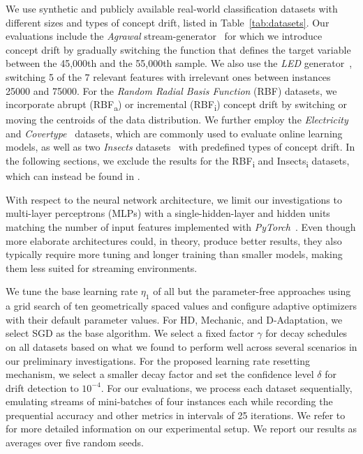 \documentclass{article} %
\begin{document}
We use synthetic and publicly available real-world classification datasets with different sizes and types of concept drift, listed in Table~\ref{tab:datasets}.
Our evaluations include the \textit{Agrawal} stream-generator~\citep{agrawalDatabaseMiningPerformance1993} for which we introduce concept drift by gradually switching the function that defines the target variable between the 45,000th and the 55,000th sample.
We also use the \textit{LED} generator~\citep{gordonClassificationRegressionTrees1984}, switching 5 of the 7 relevant features with irrelevant ones between instances 25000 and 75000.
For the \textit{Random Radial Basis Function} (RBF) datasets, we incorporate abrupt (RBF\textsubscript{a}) or incremental (RBF\textsubscript{i}) concept drift by switching or moving the centroids of the data distribution.
We further employ the \textit{Electricity} and \textit{Covertype}~\citep{misc_covertype_31} datasets, which are commonly used to evaluate online learning models, as well as two \textit{Insects} datasets~\citep{souzaChallengesBenchmarkingStream2020} with predefined types of concept drift.
In the following sections, we exclude the results for the RBF\textsubscript{i} and Insects\textsubscript{i} datasets, which can instead be found in .

With respect to the neural network architecture, we limit our investigations to multi-layer perceptrons (MLPs) with a single-hidden-layer and hidden units matching the number of input features implemented with \textit{PyTorch}~\citep{paszkePyTorchImperativeStyle2019}.
Even though more elaborate architectures could, in theory, produce better results, they also typically require more tuning and longer training than smaller models, making them less suited for streaming environments.

We tune the base learning rate $\eta_1$ of all but the parameter-free approaches using a grid search of ten geometrically spaced values and configure adaptive optimizers with their default parameter values. For HD, Mechanic, and D-Adaptation, we select SGD as the base algorithm.
We select a fixed factor $\gamma$ for decay schedules on all datasets based on what we found to perform well across several scenarios in our preliminary investigations.
For the proposed learning rate resetting mechanism, we select a smaller decay factor and set the confidence level $\delta$ for drift detection to $10^{-4}$.
For our evaluations, we process each dataset sequentially, emulating streams of mini-batches of four instances each while recording the prequential accuracy and other metrics in intervals of 25 iterations.
We refer to  for more detailed information on our experimental setup.
We report our results as averages over five random seeds.
\end{document}
